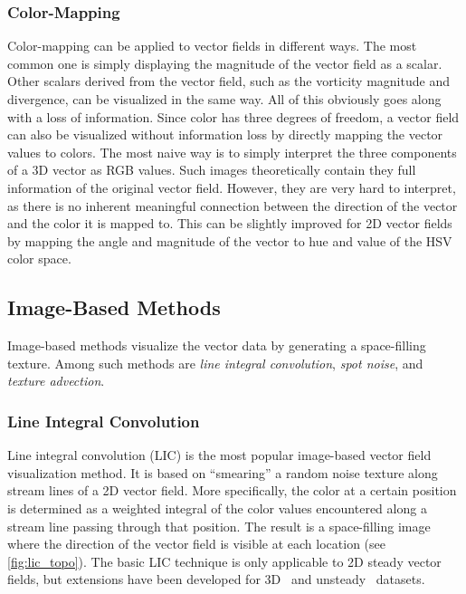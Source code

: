 %
\subsubsection{Color-Mapping}
%
Color-mapping can be applied to vector fields in different ways.
%
The most common one is simply displaying the magnitude of the vector field as a
scalar.
%
Other scalars derived from the vector field, such as the vorticity magnitude and
divergence, can be visualized in the same way.
%
All of this obviously goes along with a loss of information.
%
Since color has three degrees of freedom, a vector field can also be visualized
without information loss by directly mapping the vector values to colors.
%
The most naive way is to simply interpret the three components of a \ac{3D}
vector as RGB values.
%
Such images theoretically contain they full information of the original vector
field.
%
However, they are very hard to interpret, as there is no inherent meaningful
connection between the direction of the vector and the color it is mapped to.
%
This can be slightly improved for \ac{2D} vector fields by mapping the angle
and magnitude of the vector to hue and value of the HSV color space.
%
%
\subsection{Image-Based Methods} %
\label{sub:vector_image_based}
%
Image-based methods visualize the vector data by generating a space-filling
texture.
%
Among such methods are \emph{line integral convolution}, \emph{spot noise},
and \emph{texture advection}.
%

%
\subsubsection{Line Integral Convolution}
%
Line integral convolution (\acs{LIC})\cite{Cabral1993} is the most
popular image-based vector field visualization method.
%
It is based on ``smearing'' a random noise texture along stream lines of a
\ac{2D} vector field.
%
More specifically, the color at a certain position is determined as a weighted
integral of the color values encountered along a stream line passing through
that position.
%
The result is a space-filling image where the direction of the vector field is
visible at each location (see \cref{fig:lic_topo}).
%
The basic \ac{LIC} technique is only applicable to \ac{2D} steady vector fields,
but extensions have been developed for \ac{3D}~\cite{Rezk-Salama1999} and
unsteady~\cite{Shen1997} datasets.
%

